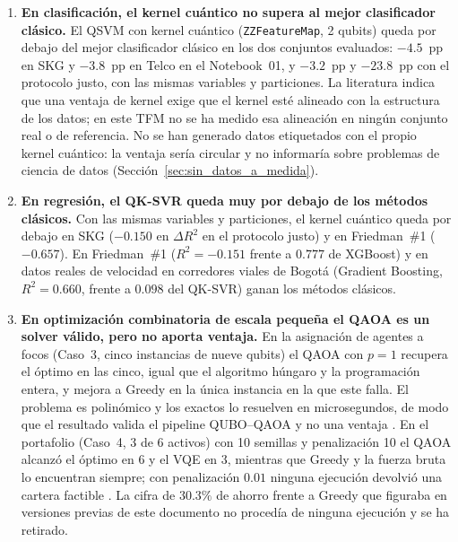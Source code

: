 \begin{enumerate}

\item \textbf{En clasificación, el kernel cuántico no supera al mejor clasificador clásico.}
El QSVM con kernel cuántico (\texttt{ZZFeatureMap}, 2 qubits) queda por debajo del mejor clasificador clásico en los dos conjuntos evaluados: $-4.5$~pp en SKG y $-3.8$~pp en Telco en el Notebook~01, y $-3.2$~pp y $-23.8$~pp con el protocolo justo, con las mismas variables y particiones. La literatura \citep{huang2021, liu2021} indica que una ventaja de kernel exige que el kernel esté alineado con la estructura de los datos; en este TFM no se ha medido esa alineación en ningún conjunto real o de referencia. No se han generado datos etiquetados con el propio kernel cuántico: la ventaja sería circular y no informaría sobre problemas de ciencia de datos (Sección~\ref{sec:sin_datos_a_medida}).

\item \textbf{En regresión, el QK-SVR queda muy por debajo de los métodos clásicos.}
Con las mismas variables y particiones, el kernel cuántico queda por debajo en SKG ($-0.150$ en $\Delta R^2$ en el protocolo justo) y en Friedman~\#1 ($-0.657$). En Friedman~\#1 ($R^2=-0.151$ frente a $0.777$ de XGBoost) y en datos reales de velocidad en corredores viales de Bogotá (Gradient Boosting, $R^2=0.660$, frente a $0.098$ del QK-SVR) ganan los métodos clásicos.

\item \textbf{En optimización combinatoria de escala pequeña el QAOA es un solver válido, pero no aporta ventaja.}
En la asignación de agentes a focos (Caso~3, cinco instancias de nueve qubits) el QAOA con $p=1$ recupera el óptimo en las cinco, igual que el algoritmo húngaro y la programación entera, y mejora a Greedy en la única instancia en la que este falla. El problema es polinómico y los exactos lo resuelven en microsegundos, de modo que el resultado valida el pipeline QUBO--QAOA y no una ventaja \citep{farhi2014}. En el portafolio (Caso~4, 3 de 6 activos) con 10 semillas y penalización 10 el QAOA alcanzó el óptimo en 6 y el VQE en 3, mientras que Greedy y la fuerza bruta lo encuentran siempre; con penalización $0.01$ ninguna ejecución devolvió una cartera factible \citep{peruzzo2014}. La cifra de $30.3\%$ de ahorro frente a Greedy que figuraba en versiones previas de este documento no procedía de ninguna ejecución y se ha retirado.


\end{enumerate}
